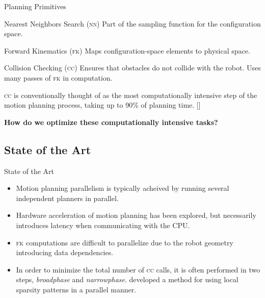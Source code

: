 \documentclass{beamer}
\begin{document}
\begin{frame}[label=p_primitives]{Planning Primitives}
\pause
\begin{block}{Nearest Neighbors Search (\textsc{nn})}
Part of the sampling function for the configuration space.
\end{block}

\begin{block}{Forward Kinematics (\textsc{fk})}
Maps configuration-space elements to physical space.
\end{block}

\begin{block}{Collision Checking (\textsc{cc})}
Ensures that obstacles do not collide with the robot. Uses many passes of \textsc{fk} in computation. 
\end{block}

\textsc{cc} is conventionally thought of as the most computationally intensive step of the motion planning process, taking up to 90\% of planning time. [\cite{paper:rrt90}]%

\end{frame}

\begin{frame}
\centering
\textbf{How do we optimize these computationally intensive tasks?}
\end{frame}

\subsection{State of the Art}

\begin{frame}{State of the Art}
\begin{itemize}
\pause \item Motion planning parallelism is typically acheived by running several independent planners in parallel. %
\pause \item Hardware acceleration of motion planning has been explored, but necessarily introduces latency when communicating with the CPU.
\pause \item \textsc{fk} computations are difficult to parallelize due to the robot geometry introducing data dependencies.
\pause \item In order to minimize the total number of \textsc{cc} calls, it is often performed in two steps, \textit{broadphase} and \textit{narrowphase}. \cite{paper:eemp} developed a method for using local sparsity patterns in a parallel manner.
\end{itemize}
\end{frame}
\end{document}
